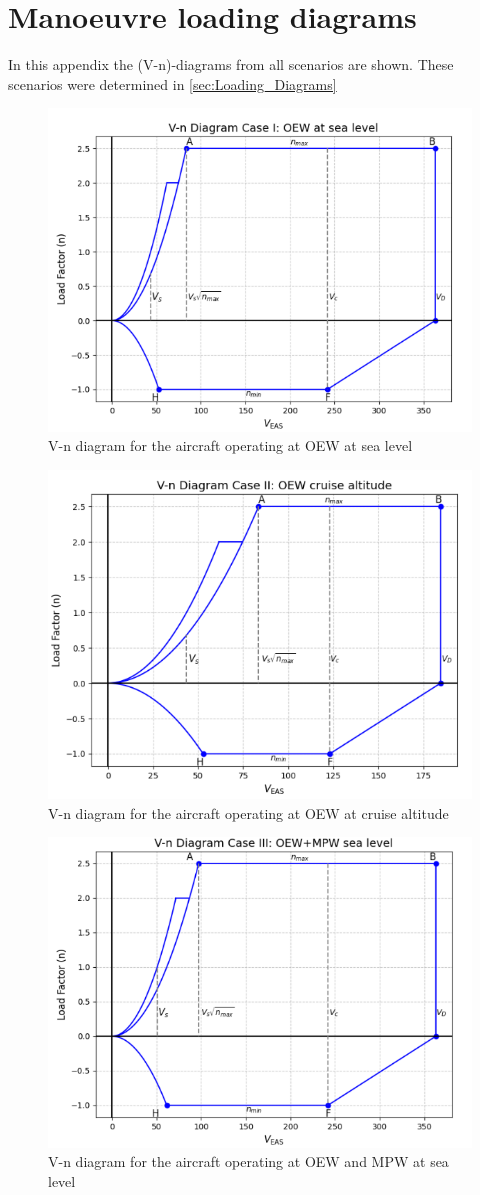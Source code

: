 \chapter{Manoeuvre loading diagrams}
\label{v-n_diagrams}
In this appendix the (V-n)-diagrams from all scenarios are shown. These scenarios were determined in \autoref{sec:Loading_Diagrams}


\begin{figure}[H]
    \centering
    \includegraphics[width=0.65\linewidth]{figures/v-n diagram case I.png}
    \caption{V-n diagram for the aircraft operating at OEW at sea level}
    \label{fig:v-n_case1}
\end{figure}

\begin{figure}[H]
    \centering
    \includegraphics[width=0.65\linewidth]{figures/v-n diagram case II.png}
    \caption{V-n diagram for the aircraft operating at OEW at cruise altitude}
    \label{fig:v-n_case2}
\end{figure}

\begin{figure}[H]
    \centering
    \includegraphics[width=0.65\linewidth]{figures/v-n diagram case III.png}
    \caption{V-n diagram for the aircraft operating at OEW and MPW at sea level}
    \label{fig:v-n_case3}
\end{figure}

